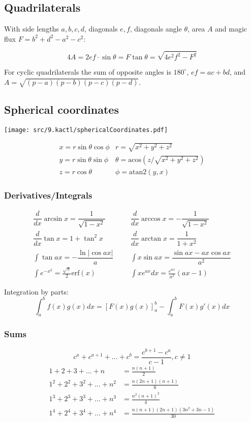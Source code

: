 \subsection{Quadrilaterals}
With side lengths $a,b,c,d$, diagonals $e, f$, diagonals angle $\theta$, area $A$ and
magic flux $F=b^2+d^2-a^2-c^2$:

\[ 4A = 2ef \cdot \sin\theta = F\tan\theta = \sqrt{4e^2f^2-F^2} \]

 For cyclic quadrilaterals the sum of opposite angles is $180^\circ$,
$ef = ac + bd$, and $A = \sqrt{(p-a)(p-b)(p-c)(p-d)}$.

\subsection{Spherical coordinates}
\centerline{\texttt{[image: src/9.kactl/sphericalCoordinates.pdf]}}
\[\begin{array}{cc}
x = r\sin\theta\cos\phi & r = \sqrt{x^2+y^2+z^2}\\
y = r\sin\theta\sin\phi & \theta = \textrm{acos}(z/\sqrt{x^2+y^2+z^2})\\
z = r\cos\theta & \phi = \textrm{atan2}(y,x)
\end{array}\]

\subsubsection{Derivatives/Integrals}
\begin{align*}
	\dfrac{d}{dx}\arcsin x = \dfrac{1}{\sqrt{1-x^2}} &&& \dfrac{d}{dx}\arccos x = -\dfrac{1}{\sqrt{1-x^2}} \\
	\dfrac{d}{dx}\tan x = 1+\tan^2 x &&& \dfrac{d}{dx}\arctan x = \dfrac{1}{1+x^2} \\
	\int\tan ax = -\dfrac{\ln|\cos ax|}{a} &&& \int x\sin ax = \dfrac{\sin ax-ax \cos ax}{a^2} \\
	\int e^{-x^2} = \frac{\sqrt \pi}{2} \text{erf}(x) &&& \int xe^{ax}dx = \frac{e^{ax}}{a^2}(ax-1)
\end{align*}

Integration by parts:
\[\int_a^bf(x)g(x)dx = [F(x)g(x)]_a^b-\int_a^bF(x)g'(x)dx\]

\subsubsection{Sums}
\[ c^a + c^{a+1} + \dots + c^{b} = \frac{c^{b+1} - c^a}{c-1}, c \neq 1 \]
\begin{align*}
	1 + 2 + 3 + \dots + n &= \frac{n(n+1)}{2} \\
	1^2 + 2^2 + 3^2 + \dots + n^2 &= \frac{n(2n+1)(n+1)}{6} \\
	1^3 + 2^3 + 3^3 + \dots + n^3 &= \frac{n^2(n+1)^2}{4} \\
	1^4 + 2^4 + 3^4 + \dots + n^4 &= \frac{n(n+1)(2n+1)(3n^2 + 3n - 1)}{30} \\
\end{align*}

